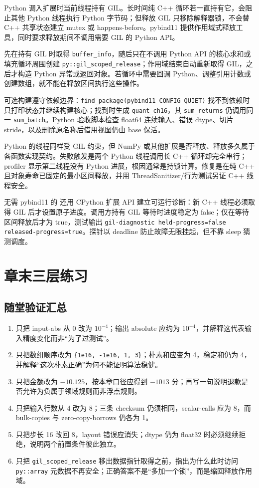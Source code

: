 Python 调入扩展时当前线程持有 GIL。长时间纯 C++ 循环若一直持有它，会阻止其他 Python 线程执行 Python 字节码；但释放 GIL 只移除解释器锁，不会替 C++ 共享状态建立 mutex 或 happens-before。pybind11 提供作用域式释放工具，同时要求释放期间不调用需要 GIL 的 Python API\autocite{pybind11docs}。

 先在持有 GIL 时取得 \texttt{buffer\_info}，随后只在不调用 Python API 的核心求和或填充循环周围创建 \texttt{py::gil\_scoped\_release}；作用域结束自动重新取得 GIL，之后才构造 Python 异常或返回对象。若循环中需要回调 Python、调整引用计数或创建数组，就不能在释放区间执行这些操作。

可选构建遵守依赖边界：\texttt{find\_package(pybind11 CONFIG QUIET)} 找不到依赖时只打印状态并继续构建核心；找到时生成 \texttt{quant\_ch16}，其 \texttt{sum\_returns} 仍调用同一 \texttt{sum\_batch}。Python 验收脚本检查 float64 连续输入、错误 dtype、切片 stride，以及删除原名称后借用视图仍由 base 保活。

Python 的线程同样受 GIL 约束，但 NumPy 或其他扩展是否释放、释放多久属于各函数实现契约。失败触发是两个 Python 线程调用长 C++ 循环却完全串行；profiler 显示第二线程没有 Python 进展，根因通常是持锁计算。修复是在纯 C++ 且对象寿命已固定的最小区间释放，并用 ThreadSanitizer/行为测试另证 C++ 线程安全。

无需 pybind11 的  还用 CPython 扩展 API 建立可运行诊断：新 C++ 线程必须取得 GIL 后才设置原子进度。调用方持有 GIL 等待时进度稳定为 false；仅在等待区间释放后才为 true，测试输出 \texttt{gil-diagnostic held-progress=false released-progress=true}。探针以 deadline 防止故障无限挂起，但不靠 sleep 猜测调度。

\section{章末三层练习}

\subsection*{随堂验证汇总}

\begin{enumerate}
  \item 只把 input-abs 从 0 改为 $10^{-4}$；输出 absolute 应约为 $10^{-4}$，并解释这代表输入精度变化而非“为了过测试”。
  \item 只把数组顺序改为 \texttt{\{1e16, -1e16, 1, 3\}}；朴素和应变为 4，稳定和仍为 4，并解释“这次朴素正确”为何不能证明算法稳健。
  \item 只把金额改为 $-10.125$，按本章口径应得到 $-1013$ 分；再写一句说明退款是否允许为负属于领域规则而非浮点规则。
  \item 只把输入行数从 4 改为 8；三条 checksum 仍须相同，scalar-calls 应为 8，而 bulk-copies 与 zero-copy-borrows 仍各为 1。
  \item 只把步长 16 改回 8，layout 错误应消失；dtype 仍为 float32 时必须继续拒绝，说明两个前置条件彼此独立。
  \item 只把 \texttt{gil\_scoped\_release} 移出数据指针取得之前，指出为什么此时访问 \texttt{py::array} 元数据不再安全；正确答案不是“多加一个锁”，而是缩回释放作用域。
\end{enumerate}

